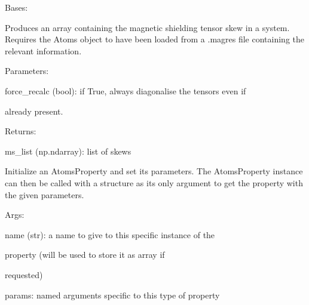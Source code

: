 \documentclass[letterpaper,10pt,english]{sphinxmanual}
\begin{document}
\begin{fulllineitems}
\label{doctree/soprano.properties.nmr.ms:soprano.properties.nmr.ms.MSSkew}
Bases: {\hyperref[doctree/soprano.properties.atomsproperty:soprano.properties.atomsproperty.AtomsProperty]{}}

Produces an array containing the magnetic shielding tensor skew
in a system.
Requires the Atoms object to have been loaded from a .magres file
containing the relevant information.

\begin{DUlineblock}{0em}
\item[] Parameters:
\item[]
\begin{DUlineblock}{\DUlineblockindent}
\item[] force\_recalc (bool): if True, always diagonalise the tensors even if
\item[]
\begin{DUlineblock}{\DUlineblockindent}
\item[] already present.
\end{DUlineblock}
\end{DUlineblock}
\end{DUlineblock}

\begin{DUlineblock}{0em}
\item[] Returns:
\item[]
\begin{DUlineblock}{\DUlineblockindent}
\item[] ms\_list (np.ndarray): list of skews
\end{DUlineblock}
\end{DUlineblock}

Initialize an AtomsProperty and set its parameters.
The AtomsProperty instance can then be called with a structure as its
only argument to get the property with the given parameters.

\begin{DUlineblock}{0em}
\item[] Args:
\item[]
\begin{DUlineblock}{\DUlineblockindent}
\item[] name (str): a name to give to this specific instance of the
\item[]
\begin{DUlineblock}{\DUlineblockindent}
\item[] property (will be used to store it as array if
\item[] requested)
\end{DUlineblock}
\item[] params: named arguments specific to this type of property
\end{DUlineblock}
\end{DUlineblock}


\end{fulllineitems}
\end{document}
